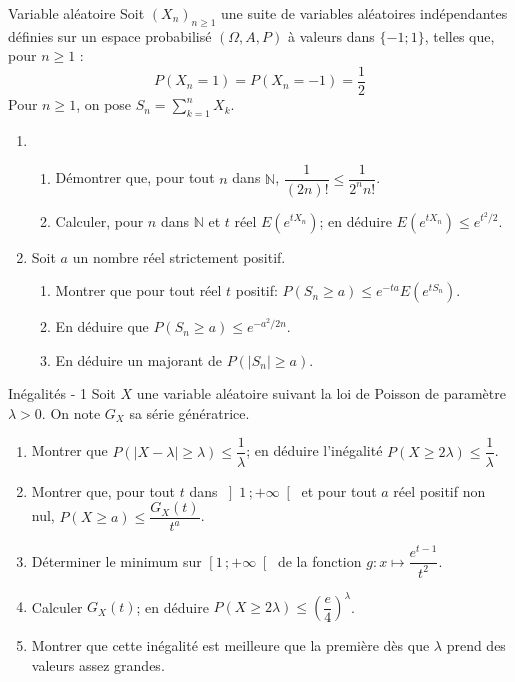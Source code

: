 \documentclass[french, a4paper, 11pt]{article}
\newcommand{\N}{\mathbb{N}}   %
\newcommand{\po}{\left(}         %
\newcommand{\pf}{\right)}        %
\newcommand{\pof}[1]{\po #1 \pf} %
\newcommand{\interoo}[2]{\left]#1\,;#2\right[}   %
\newcommand{\interfo}[2]{\left[#1\,;#2\right[}   %
\begin{document}
\begin{cadre}{Variable aléatoire}
  Soit \(\pof{X_{n}}_{n\geqslant 1}\) une suite de variables aléatoires indépendantes définies sur un espace probabilisé \(\pof{\Omega, A, P}\) à valeurs dans \(\lbrace -1;1\rbrace\), telles que, pour \(n\geqslant 1\) :
  \[P\pof{X_{n} = 1} = P\pof{X_{n} = -1} = \dfrac{1}{2}\]
  Pour \(n\geqslant 1\), on pose \(S_{n} = \sum_{k=1}^{n} X_{k}\).
  \begin{enumerate}
      \item
      \begin{enumerate}
        \item Démontrer que, pour tout \(n\) dans \(\N\), \(\dfrac{1}{(2n)!}\leqslant\dfrac{1}{2^{n}n!}\).
        \item Calculer, pour \(n\) dans \(\N\) et \(t\) réel \(E\pof{e^{tX_{n}}}\); en déduire \(E(e^{tX_{n}}) \leqslant e^{t^{2}/2}\).
      \end{enumerate}
    \item Soit \(a\) un nombre réel strictement positif.
      \begin{enumerate}
        \item Montrer que pour tout réel \(t\) positif: \(P(S_{n}\geqslant a) \leqslant e^{-ta}E(e^{tS_{n}})\).
        \item En déduire que \(P(S_{n}\geqslant a)\leqslant e^{-a^{2}/2n}\).
        \item En déduire un majorant de \(P(\lvert S_{n}\rvert \geqslant a)\).
      \end{enumerate}
  \end{enumerate}
\end{cadre}

\begin{cadre}{Inégalités - 1}
  Soit $X$ une variable aléatoire suivant la loi de Poisson de paramètre $\lambda >0$. On note $G_{X}$ sa série génératrice.
  \begin{enumerate}
    \item Montrer que $P\pof{\lvert X-\lambda\rvert \geqslant \lambda}\leqslant \dfrac{1}{\lambda}$; en déduire l'inégalité $P(X\geqslant 2\lambda) \leqslant \dfrac{1}{\lambda}$.
    \item Montrer que, pour tout $t$ dans $\interoo{1}{+\infty}$ et pour tout $a$ réel positif non nul, $P(X\geqslant a)\leqslant \dfrac{G_{X}(t)}{t^{a}}$.
    \item Déterminer le minimum sur $\interfo{1}{+\infty}$ de la fonction $g:x\mapsto\dfrac{e^{t-1}}{t^{2}}$.
    \item Calculer $G_{X}(t)$; en déduire $P(X\geqslant 2\lambda)\leqslant\pof{\dfrac{e}{4}}^{\lambda}$.
    \item Montrer que cette inégalité est meilleure que la première dès que $\lambda$ prend des valeurs assez grandes.
  \end{enumerate}
\end{cadre}
\end{document}

